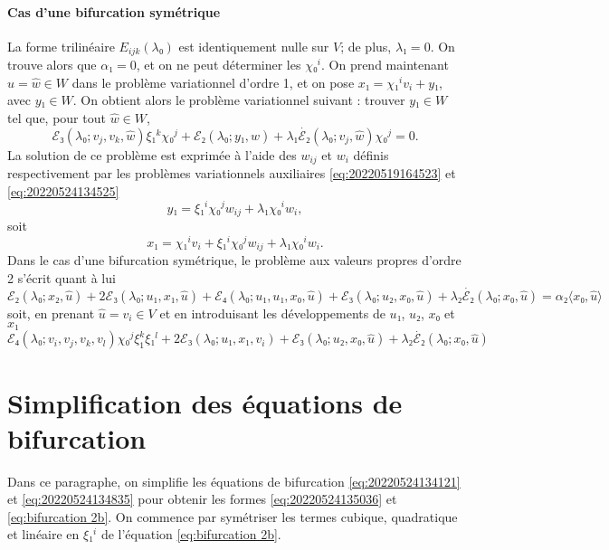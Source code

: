\documentclass[12pt, final]{amsart}
\theoremstyle{definition}
\begin{document}
\paragraph{Cas d'une bifurcation symétrique}La forme trilinéaire \(E_{i j k}(λ₀)\) est identiquement nulle sur \(V\); de plus, \(λ₁ = 0\). On trouve alors que \(α₁ = 0\), et on ne peut déterminer les \(χ₀^i\). On prend maintenant \(\hat{u} = \hat{w}∈W\) dans le problème variationnel d'ordre 1, et on pose \(x₁ = χ₁^i v_i + y₁\), avec \(y₁∈W\). On obtient alors le problème variationnel suivant : trouver \(y₁∈W\) tel que, pour tout \(\hat{w}∈W\),
\begin{equation} ℰ₃(λ₀; v_j, v_k, \hat{w}) ξ₁^k χ₀^j
  +ℰ₂(λ₀; y₁, \hat{w}) + λ₁ \dot{ℰ₂}
 (λ₀; v_j, \hat{w}) χ₀^j = 0. \end{equation}
La solution de ce problème est exprimée à l'aide des \(w_{i j}\) et \(w_i\) définis respectivement par les problèmes variationnels auxiliaires \eqref{eq:20220519164523} et \eqref{eq:20220524134525}
\begin{equation} y₁ = ξ₁^i χ₀^j w_{i j} + λ₁ χ₀^i w_i, \end{equation}
soit
\begin{equation} x₁ = χ₁^i v_i + ξ₁^i χ₀^j w_{i j} + λ₁ χ₀^i
  w_i . \end{equation}
Dans le cas d'une bifurcation symétrique, le problème aux valeurs propres d'ordre 2 s'écrit quant à lui
\begin{equation} ℰ₂(λ₀; x₂, \hat{u}) + 2ℰ₃(λ₀; u₁,
  x₁, \hat{u}) +ℰ₄ (λ₀; u₁, u₁, x₀, \hat{u})
  +ℰ₃(λ₀; u₂, x₀, \hat{u}) + λ₂
  \dot{ℰ₂}(λ₀; x₀, \hat{u}) = α₂ 〈 x₀,
  \hat{u} 〉 \end{equation}
soit, en prenant \(\hat{u} = \widehat{v_i}∈V\) et en introduisant les développements de \(u₁\), \(u₂\), \(x₀ \) et \(x₁\)
\begin{equation} ℰ₄ (λ₀; v_i, v_j, v_k, v_l) χ₀^j ξ_{1 }^k ξ₁^l
  + 2ℰ₃(λ₀; u₁, x₁, v_i) +ℰ₃(λ₀ ;
  u₂, x₀, \hat{u}) + λ₂ \dot{ℰ₂}(λ₀; x₀,
  \hat{u}) \end{equation}
\section{Simplification des équations de
bifurcation}\label{sec:20220524134954}

Dans ce paragraphe, on simplifie les équations de bifurcation \eqref{eq:20220524134121} et \eqref{eq:20220524134835} pour obtenir les formes \eqref{eq:20220524135036} et \eqref{eq:bifurcation 2b}. On commence par symétriser les termes cubique, quadratique et linéaire en \(ξ₁^i\) de
l'équation \eqref{eq:bifurcation 2b}.
\end{document}
